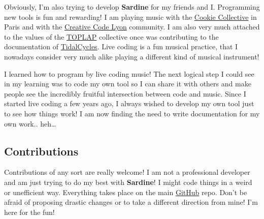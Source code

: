 \documentclass[11pt]{article}
\begin{document}
Obviously, I'm also trying to develop \textbf{Sardine} for my friends and I. Programming new tools is fun and rewarding! I am playing music with the \href{https://cookie.paris/}{Cookie Collective} in Paris and with the \href{https://discord.gg/arRBSfdXV3}{Creative Code Lyon} community. I am also very much attached to the values of the \href{https://toplap.org/}{TOPLAP} collective once was contributing to the documentation of \href{https://tidalcycles.org/}{TidalCycles}. Live coding is a fun musical practice, that I nowadays consider very much alike playing a different kind of musical instrument!

I learned how to program by live coding music! The next logical step I could see in my learning was to code my own tool so I can share it with others and make people see the incredibly fruitful intersection between code and music. Since I started live coding a few years ago, I always wished to develop my own tool just to see how things work! I am now finding the need to write documentation for my own work.. heh\ldots{}

\subsection{Contributions}
\label{sec:orgd2fd39c}

Contributions of any sort are really welcome! I am not a professional developer and am just trying to do my best with \textbf{Sardine}! I might code things in a weird or unefficient way. Everything takes place on the main \href{https://github.com/Bubobubobubobubo/sardine}{GitHub} repo. Don't be afraid of proposing drastic changes or to take a different direction from mine! I'm here for the fun!
\end{document}

